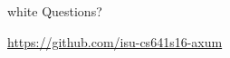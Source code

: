 \section*{}





\begin{frame}
\begin{beamercolorbox}[center]{white}
  {\Large Questions?}

  \vspace{2em}\hfill

  \url{https://github.com/isu-cs641s16-axum}
\end{beamercolorbox}
\end{frame}
